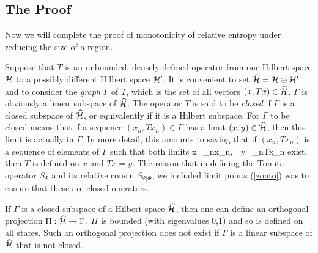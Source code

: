 \documentclass[12pt]{article}
\def\h{\widehat}
\numberwithin{equation}{section}
\begin{document}
\subsection{The Proof}\label{theproof}

Now we will complete the proof of monotonicity of relative entropy under reducing the size of a region.

Suppose that $T$ is an unbounded, densely defined operator from one Hilbert space ${\mathcal H}$ to a possibly different Hilbert space ${\mathcal H}'$.
It is convenient to set $\h\H=\H\oplus \H'$ and to consider the {\it graph}  $\Gamma$ of $T$, which is the set of all vectors $(x,Tx)\in \h \H$.  
$\Gamma$ is obviously a linear subspace of $\h\H$.  The operator $T$ is said to be {\it closed} if $\Gamma$ is a closed subspace
of $\h\H$, or equivalently if it is a Hilbert subspace.   For $\Gamma$ to be closed means that if a sequence $(x_n,Tx_n)\in\Gamma$
has a limit $(x,y)\in\h\H$, then this limit is actually in $\Gamma$.  In more detail, this amounts to saying that
 if $(x_n,Tx_n)$ is a sequence of elements
of $\Gamma$ such that both limits
\be\label{formo} x=\lim_{n\to\infty}x_n,~~y=\lim_{n\to\infty}Tx_n\ee
exist,
 then $T$ is defined on $x$ and $Tx=y$.   The reason that in defining the Tomita operator $S_\Psi$
 and its relative cousin $S_{\Psi|\Phi}$, we included limit points (\ref{zonto}) was to ensure that these are closed operators.
 
 If $\Gamma$ is a closed subspace of a Hilbert space $\h\H$, then one can define an orthogonal projection $\Pi:\h\H\to \Gamma$.   $\Pi$ is bounded
 (with eigenvalues 0,1) and so is defined on all states.
 Such an orthogonal projection does not exist if $\Gamma$ is a linear subspace of $\h\H$ that is not closed.  
 
\end{document}
